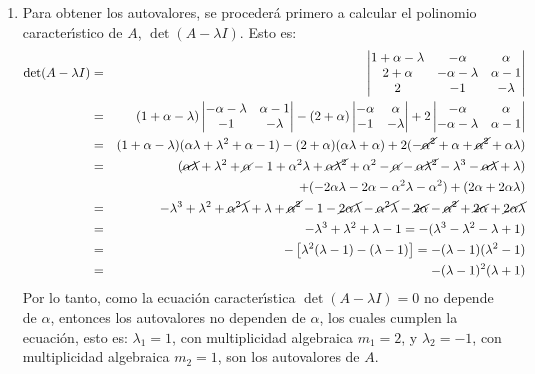 \begin{solucion}
 $\phantom{0}$
 \begin{enumerate}[$a$)]
  \item Para obtener los autovalores, se proceder\'a primero a calcular el polinomio caracter\'{\i}stico de $A$, $\det(A - \lambda I)$. Esto es:
  \begin{eqnarray*}
   \det(A - \lambda I) & = &
   \begin{vmatrix}
    1 + \alpha - \lambda & -\alpha & \alpha \\
    2 + \alpha & -\alpha - \lambda & \alpha - 1 \\
    2 & -1 & -\lambda 
   \end{vmatrix}
   \\
   & = &
   (1 + \alpha - \lambda)
   \begin{vmatrix}
    -\alpha-\lambda & \alpha - 1 \\
    -1 & - \lambda
   \end{vmatrix}
   -(2+\alpha)
   \begin{vmatrix}
    -\alpha & \alpha \\ 
    -1 & -\lambda 
   \end{vmatrix}
   + 2
   \begin{vmatrix}
    -\alpha & \alpha \\
    -\alpha - \lambda & \alpha - 1
   \end{vmatrix}
   \\
   & = & 
   (1+\alpha - \lambda)( \alpha\lambda + \lambda^2 +\alpha - 1 )
   -(2+\alpha)( \alpha\lambda + \alpha )
   +2(-\cancel{\alpha^2} + \alpha + \cancel{\alpha^2} + \alpha\lambda ) \\
   & = & 
   (\cancel{\alpha\lambda} + \lambda^2 + \cancel{\alpha} - 1 + \alpha^2\lambda + \cancel{\alpha\lambda^2} + \alpha^2 - \cancel{\alpha} - \cancel{\alpha\lambda^2} - \lambda^3 - \cancel{\alpha\lambda} + \lambda) \\ 
   & & + (- 2\alpha\lambda - 2\alpha - \alpha^2\lambda - \alpha^2) + (2\alpha + 2\alpha\lambda) \\
   & = & -\lambda^3 + \lambda^2 + \cancel{\alpha^2\lambda} + \lambda + \cancel{\alpha^2} - 1 - \cancel{2\alpha\lambda} - \cancel{\alpha^2\lambda} - \cancel{2\alpha} - \cancel{\alpha^2} + \cancel{2\alpha} + \cancel{2\alpha\lambda} \\
   & = & -\lambda^3 + \lambda^2 + \lambda - 1 = -(\lambda^3 - \lambda^2 - \lambda + 1) \\
   & = & -\left[ \lambda^2(\lambda-1) - (\lambda- 1) \right] = -(\lambda - 1)(\lambda^2 - 1) \\
   & = & -(\lambda-1)^2(\lambda + 1)
  \end{eqnarray*}
  Por lo tanto, como la ecuaci\'on caracter\'{\i}stica $\det(A - \lambda I) = 0$ no depende de $\alpha$, entonces los autovalores no dependen de $\alpha$, los cuales cumplen la ecuaci\'on, esto es: $\lambda_1 = 1$, con multiplicidad algebraica $m_1 = 2$, y $\lambda_2 = -1$, con multiplicidad algebraica $m_2 = 1$, son los autovalores de $A$.
  

\end{enumerate}
\end{solucion}

